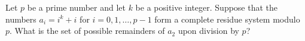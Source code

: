 \documentclass{article}
\begin{document}
\setlength{\parindent}{0pt}
Let \(\displaystyle p\) be a prime number and let \(\displaystyle k\) be a positive integer. Suppose that the numbers \(\displaystyle a_i=i^k+i\) for \(\displaystyle i=0,1,\ldots,p-1\) form a complete residue system modulo \(\displaystyle p\). What is the set of possible remainders of \(\displaystyle a_2\) upon division by \(\displaystyle p\)?
\end{document}
